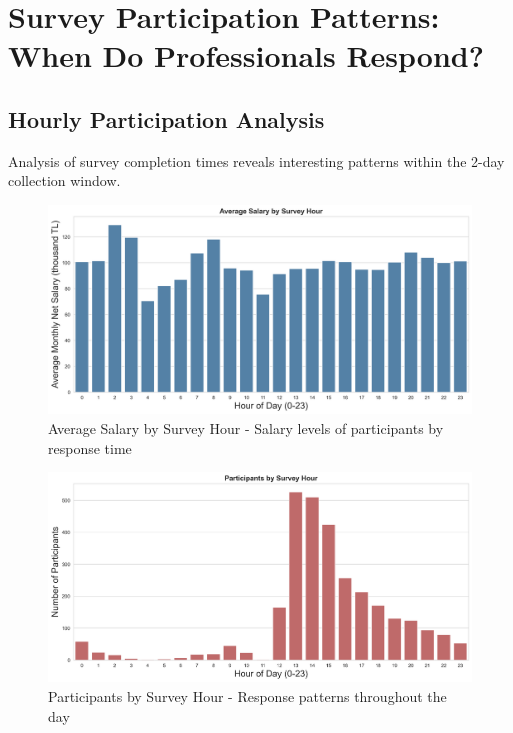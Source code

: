 \documentclass[12pt,a4paper]{article}
\begin{document}
\section{Survey Participation Patterns: When Do Professionals Respond?}

\subsection{Hourly Participation Analysis}
Analysis of survey completion times reveals interesting patterns within the 2-day collection window.

\begin{figure}[H]
    \centering
    \includegraphics[width=\textwidth]{figures/barplot_hourly_avg_salary.png}
    \caption{Average Salary by Survey Hour - Salary levels of participants by response time}
\end{figure}

\begin{figure}[H]
    \centering
    \includegraphics[width=\textwidth]{figures/barplot_hourly_participants.png}
    \caption{Participants by Survey Hour - Response patterns throughout the day}
\end{figure}
\end{document}
